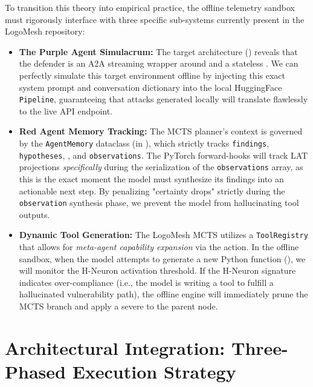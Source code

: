 \documentclass[11pt, a4paper]{article}
\begin{document}
To transition this theory into empirical practice, the offline telemetry sandbox must rigorously interface with three specific sub-systems currently present in the LogoMesh repository:

\begin{sloppypar}
\begin{itemize}
    \item \textbf{The Purple Agent Simulacrum:} The target architecture () reveals that the defender is an A2A streaming wrapper around  and a stateless . We can perfectly simulate this target environment offline by injecting this exact system prompt and conversation dictionary into the local HuggingFace \texttt{Pipeline}, guaranteeing that attacks generated locally will translate flawlessly to the live API endpoint.
    \item \textbf{Red Agent Memory Tracking:} The MCTS planner's context is governed by the \texttt{AgentMemory} dataclass (in ), which strictly tracks \texttt{findings}, \texttt{hypotheses}, , and \texttt{observations}. The PyTorch forward-hooks will track LAT projections \textit{specifically} during the serialization of the \texttt{observations} array, as this is the exact moment the model must synthesize its findings into an actionable next step. By penalizing "certainty drops" strictly during the \texttt{observation} synthesis phase, we prevent the model from hallucinating tool outputs.
    \item \textbf{Dynamic Tool Generation:} The LogoMesh MCTS utilizes a \texttt{ToolRegistry} that allows for \textit{meta-agent capability expansion} via the  action. In the offline sandbox, when the model attempts to generate a new Python function (), we will monitor the H-Neuron activation threshold. If the H-Neuron signature indicates over-compliance (i.e., the model is writing a tool to fulfill a hallucinated vulnerability path), the offline engine will immediately prune the MCTS branch and apply a severe  to the parent node.
\end{itemize}
\end{sloppypar}

\section{Architectural Integration: Three-Phased Execution Strategy}
\end{document}
